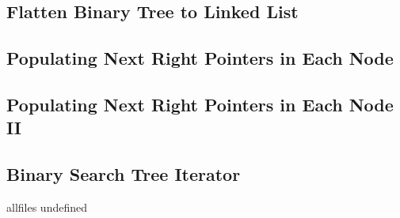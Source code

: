 \documentclass{article}
\begin{document}
\begin{CJK}{UTF8}{gbsn}     %

\else

\subsection{Flatten Binary Tree to Linked List}    

\subsection{Populating Next Right Pointers in Each Node}    

\subsection{Populating Next Right Pointers in Each Node II}    

\subsection{Binary Search Tree Iterator}    


\fi

\ifx allfiles undefined
\end{CJK}
\end{document}
